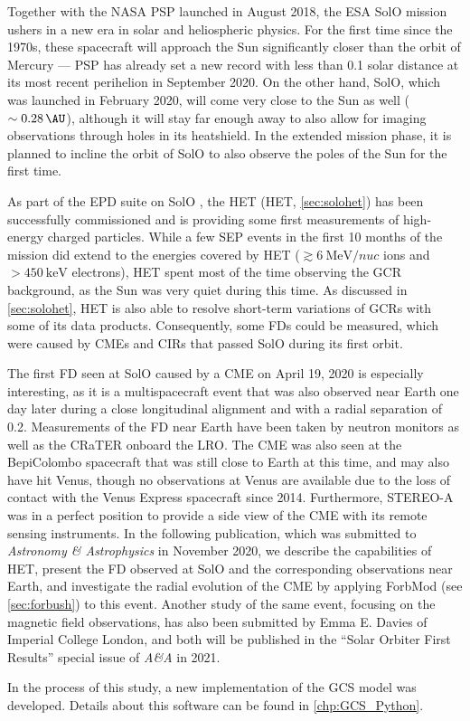 Together with the NASA \ac{PSP} launched in August 2018, the ESA \ac{SolO} mission ushers in a new era in solar and heliospheric physics. For the first time since the 1970s, these spacecraft will approach the Sun significantly closer than the orbit of Mercury --- \ac{PSP} has already set a new record with less than \SI{0.1}{\AU} solar distance at its most recent perihelion in September 2020. On the other hand, \ac{SolO}, which was launched in February 2020, will come very close to the Sun as well ($\sim\SI{0.28}{\AU}$), although it will stay far enough away to also allow for imaging observations through holes in its heatshield. In the extended mission phase, it is planned to incline the orbit of \ac{SolO} to also observe the poles of the Sun for the first time.

As part of the \ac{EPD} suite on \ac{SolO} \citep{RodriguezPacheco-2019-EPD}, the \acl{HET} (\acs{HET}, \autoref{sec:solohet}) has been successfully commissioned and is providing some first measurements of high-energy charged particles. While a few \ac{SEP} events in the first 10 months of the mission did extend to the energies covered by \ac{HET} ($\gtrsim\SI{6}{\mega\electronvolt\per nuc}$ ions and $>\SI{450}{\kilo\electronvolt}$ electrons), \ac{HET} spent most of the time observing the \ac{GCR} background, as the Sun was very quiet during this time. As discussed in \autoref{sec:solohet}, \ac{HET} is also able to resolve short-term variations of \acp{GCR} with some of its data products. Consequently, some \acp{FD} could be measured, which were caused by \acp{CME} and \acp{CIR} that passed \ac{SolO} during its first orbit.

The first \ac{FD} seen at \ac{SolO} caused by a \ac{CME} on April 19, 2020 is especially interesting, as it is a multispacecraft event that was also observed near Earth one day later during a close longitudinal alignment and with a radial separation of \SI{0.2}{\AU}. Measurements of the \ac{FD} near Earth have been taken by neutron monitors as well as the \ac{CRaTER} onboard the \ac{LRO}. The \ac{CME} was also seen at the BepiColombo spacecraft that was still close to Earth at this time, and may also have hit Venus, though no observations at Venus are available due to the loss of contact with the Venus Express spacecraft since 2014. Furthermore, \acs{STEREO}-A was in a perfect position to provide a side view of the \ac{CME} with its remote sensing instruments. In the following publication, which was submitted to \textit{Astronomy \& Astrophysics} in November 2020, we describe the capabilities of \ac{HET}, present the \ac{FD} observed at \ac{SolO} and the corresponding observations near Earth, and investigate the radial evolution of the \ac{CME} by applying \acs{ForbMod} (see \autoref{sec:forbush}) to this event. Another study of the same event, focusing on the magnetic field observations, has also been submitted by Emma E. Davies of Imperial College London, and both will be published in the ``Solar Orbiter First Results'' special issue of \textit{A\&A} in 2021.

In the process of this study, a new implementation of the \ac{GCS} model \citep{Thernisien-2011-GCS} was developed. Details about this software can be found in \autoref{chp:GCS_Python}.

